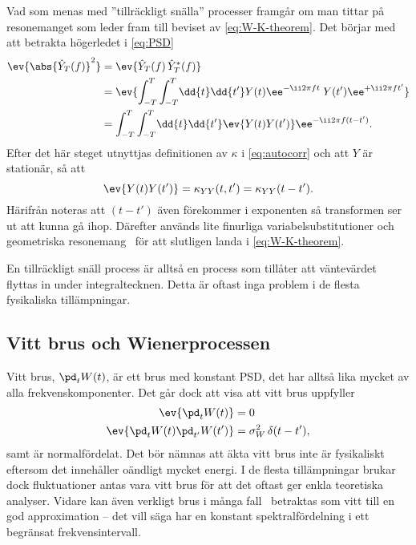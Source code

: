 Vad som menas med ''tillräckligt snälla'' processer framgår om man tittar på resonemanget som leder fram till beviset av \eqref{eq:W-K-theorem}. Det börjar med att betrakta högerledet i \eqref{eq:PSD}
\begin{equation}
\begin{aligned}
\ev{\abs{\hat{Y}_T(f)}^2}&=\ev{\hat{Y}_T(f)\,\hat{Y}_T^*(f)}\\
&=\ev{
\int_{-T}^T\int_{-T}^T\!\dd{t}\dd{t'} Y(t)\ee^{-\ii 2\pi ft}
 \;Y(t')\ee^{+\ii 2\pi ft'}
}\\
&=\int_{-T}^T\int_{-T}^T\!\dd{t}\dd{t'} 
\ev{Y(t)Y(t')} \ee^{-\ii 2\pi f(t-t')}.
\end{aligned}
\end{equation}
Efter det här steget utnyttjas definitionen av $\kappa$ i \eqref{eq:autocorr} och att $Y$ är stationär, så att
\begin{equation}
\ev{Y(t)Y(t')} = \kappa_{YY}(t, t') = \kappa_{YY}(t-t').
\end{equation}
Härifrån noteras att $(t-t')$ även förekommer i exponenten så transformen ser ut att kunna gå ihop. Därefter används lite finurliga variabelsubstitutioner och geometriska resonemang~\cite{Miller_probability2012} för att slutligen landa i \eqref{eq:W-K-theorem}.

En tillräckligt snäll process är alltså en process som tillåter att väntevärdet flyttas in under integraltecknen. Detta är oftast inga problem i de flesta fysikaliska tillämpningar. 


\subsection{Vitt brus och Wienerprocessen}\label{sec:white_noise}
Vitt brus, $\pd_tW(t)$,\footnotemark{} är ett brus med konstant PSD, det har alltså lika mycket av alla frekvenskomponenter. Det går dock att visa att vitt brus uppfyller \cite{Miller_probability2012}
\begin{equation}\label{eq:white_noise}
\begin{aligned}
\ev{\pd_tW(t)}&=0 \\
\ev{\pd_tW(t)\pd_{t'}W(t')}&= \sigma_W^2 \, \delta(t-t'),
\end{aligned}
\end{equation}
samt är normalfördelat. 
Det bör nämnas att äkta vitt brus inte är fysikaliskt eftersom det innehåller oändligt mycket energi. I de flesta tillämpningar brukar dock fluktuationer antas vara vitt brus för att det oftast ger enkla teoretiska analyser. Vidare kan även verkligt brus i många fall~\cite{Engelberg_noise2007} betraktas som vitt till en god approximation -- det vill säga har en konstant spektralfördelning i ett begränsat frekvensintervall. 

